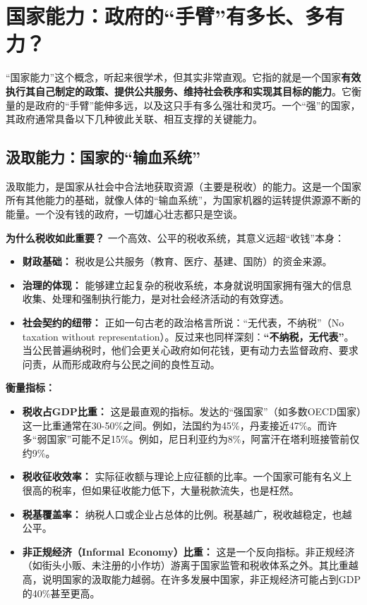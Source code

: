\hrulefill

\section{国家能力：政府的“手臂”有多长、多有力？}

“国家能力”这个概念，听起来很学术，但其实非常直观。它指的就是一个国家\textbf{有效执行其自己制定的政策、提供公共服务、维持社会秩序和实现其目标的能力}。它衡量的是政府的“手臂”能伸多远，以及这只手有多么强壮和灵巧。一个“强”的国家，其政府通常具备以下几种彼此关联、相互支撑的关键能力。

\subsection{汲取能力：国家的“输血系统”}

汲取能力，是国家从社会中合法地获取资源（主要是税收）的能力。这是一个国家所有其他能力的基础，就像人体的“输血系统”，为国家机器的运转提供源源不断的能量。一个没有钱的政府，一切雄心壮志都只是空谈。

\textbf{为什么税收如此重要？}
一个高效、公平的税收系统，其意义远超“收钱”本身：
\begin{itemize}
    \item \textbf{财政基础：} 税收是公共服务（教育、医疗、基建、国防）的资金来源。
    \item \textbf{治理的体现：} 能够建立起复杂的税收系统，本身就说明国家拥有强大的信息收集、处理和强制执行能力，是对社会经济活动的有效穿透。
    \item \textbf{社会契约的纽带：} 正如一句古老的政治格言所说：“无代表，不纳税”（No taxation without representation）。反过来也同样深刻：\textbf{“不纳税，无代表”}。当公民普遍纳税时，他们会更关心政府如何花钱，更有动力去监督政府、要求问责，从而形成政府与公民之间的良性互动。
\end{itemize}

\textbf{衡量指标：}
\begin{itemize}
    \item \textbf{税收占GDP比重：} 这是最直观的指标。发达的“强国家”（如多数OECD国家）这一比重通常在30-50\%之间。例如，法国约为45\%，丹麦接近47\%。而许多“弱国家”可能不足15\%。例如，尼日利亚约为8\%，阿富汗在塔利班接管前仅约9\%。
    \item \textbf{税收征收效率：} 实际征收额与理论上应征额的比率。一个国家可能有名义上很高的税率，但如果征收能力低下，大量税款流失，也是枉然。
    \item \textbf{税基覆盖率：} 纳税人口或企业占总体的比例。税基越广，税收越稳定，也越公平。
    \item \textbf{非正规经济（Informal Economy）比重：} 这是一个反向指标。非正规经济（如街头小贩、未注册的小作坊）游离于国家监管和税收体系之外。其比重越高，说明国家的汲取能力越弱。在许多发展中国家，非正规经济可能占到GDP的40\%甚至更高。
\end{itemize}

